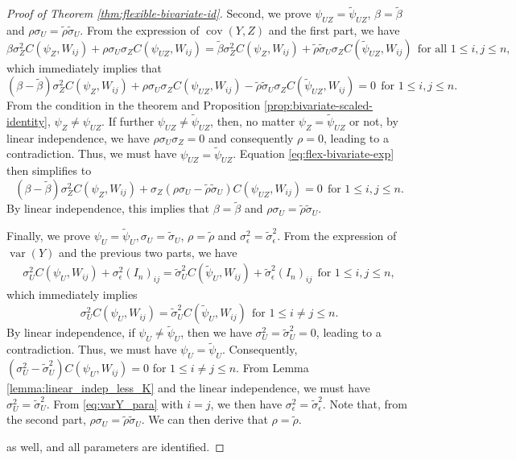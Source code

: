 \documentclass[11pt]{article}
\theoremstyle{definition}
\theoremstyle{remark}
\DeclareMathOperator{\var}{var}
\DeclareMathOperator{\cov}{cov}
\begin{document}
\begin{proof}[Proof of Theorem \ref{thm:flexible-bivariate-id}]
Second, we prove $\psi_{UZ} = \tilde\psi_{UZ}$,  $\beta = \tilde\beta$ and $\rho\sigma_U = \tilde\rho\tilde\sigma_U$. 
From the expression of $\cov(Y,Z)$ and the first part, we have 
\[\beta\sigma_Z^2 C(\psi_{Z}, W_{ij}) + \rho \sigma_U\sigma_Z C(\psi_{UZ}, W_{ij}) = \tilde\beta\sigma_Z^2 C(\psi_{Z}, W_{ij}) + \tilde\rho \tilde\sigma_U\sigma_Z  C(\tilde\psi_{UZ}, W_{ij})
\ \  
\text{for all $1\le i,j \le n$},
\]
which immediately implies that 
\begin{equation}\label{eq:flex-bivariate-exp}(\beta-\tilde\beta)\sigma_Z^2 C(\psi_{Z}, W_{ij}) + \rho \sigma_U\sigma_Z C(\psi_{UZ}, W_{ij}) - \tilde\rho \tilde\sigma_U\sigma_Z C(\tilde\psi_{UZ}, W_{ij}) = 0
\ \ 
\text{for $1\le i,j \le n$}.
\end{equation}
From the condition in the theorem and Proposition \ref{prop:bivariate-scaled-identity}, $\psi_{Z} \ne \psi_{UZ}$. 
If further $\psi_{UZ} \ne \tilde\psi_{UZ}$, then, no matter $\psi_{Z} = \tilde \psi_{UZ}$ or not, by linear independence, we have $\rho \sigma_U\sigma_Z = 0$ and consequently $\rho = 0$, leading to a contradiction. 
Thus, we must have $\psi_{UZ} = \tilde\psi_{UZ}$.
Equation \eqref{eq:flex-bivariate-exp} then simplifies to 
\[
(\beta-\tilde\beta)\sigma_Z^2 C(\psi_{Z}, W_{ij}) + \sigma_Z (\rho \sigma_U - \tilde\rho \tilde\sigma_U )C(\psi_{UZ}, W_{ij}) = 0
\ \ 
\text{for $1\le i,j \le n$}.
\]
By linear independence, this implies that 
$\beta = \tilde\beta$ and $\rho\sigma_U = \tilde\rho\tilde\sigma_U$.



Finally, we prove $\psi_U=\tilde\psi_U, \sigma_U = \tilde\sigma_U$, $\rho = \tilde\rho$ and $\sigma_\epsilon^2 = \tilde\sigma_\epsilon^2$. 
From the expression of $\var(Y)$ and the previous two parts, we have  
\begin{align}\label{eq:varY_para}
    \sigma_U^2 C(\psi_U, W_{ij}) + \sigma_\epsilon^2 (I_n)_{ij} = \tilde\sigma_U^2 C(\tilde\psi_U, W_{ij})+ \tilde\sigma_\epsilon^2(I_n)_{ij}
\ \ 
\text{for $1\le i,j \le n$}, 
\end{align}
which immediately implies 
\[\sigma_U^2 C(\psi_U, W_{ij})  = \tilde\sigma_U^2 C(\tilde\psi_U, W_{ij})
\ \ 
\text{for $1\le i \ne j \le n$}. 
\] 
By linear independence, if $\psi_U \neq \tilde\psi_U$, 
then we have $\sigma_U^2 = \tilde\sigma_U^2=0$, leading to a contradiction. 
Thus, we must have $\psi_U = \tilde\psi_U$. Consequently, 
$
(\sigma_U^2 - \tilde\sigma_U^2) C(\psi_U, W_{ij}) = 0
$
for $1\le i \ne j \le n$. 
From Lemma \ref{lemma:linear_indep_less_K} and the linear independence, we must have $\sigma_U^2 = \tilde\sigma_U^2$. 
From \eqref{eq:varY_para} with $i=j$, we then have $\sigma_\epsilon^2 = \tilde\sigma_\epsilon^2$. 
Note that, from the second part, $\rho\sigma_U=\tilde\rho \tilde\sigma_U$. 
We can then derive that $\rho = \tilde\rho$. 

as well, and all parameters are identified.
\end{proof}
\end{document}
